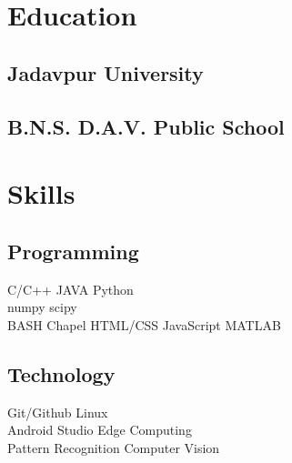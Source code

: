 \documentclass[]{myCV}
\begin{document}
\hfill
\begin{minipage}[t]{0.33\textwidth}


\section{Education}

\subsection{Jadavpur University}
\sectionsep

\subsection{B.N.S. D.A.V. Public School}
\sectionsep

\sectionsep

\section{Skills}
\subsection{Programming}
C/C++ \textbullet{} JAVA \textbullet{} Python \\
numpy \textbullet{} scipy \\
BASH \textbullet{} Chapel \textbullet{} HTML/CSS \textbullet{} JavaScript \textbullet{} MATLAB
\sectionsep

\subsection{Technology}
Git/Github \textbullet{} Linux \\
Android Studio \textbullet{} Edge Computing \\
Pattern Recognition \textbullet{} Computer Vision \\
\sectionsep


\end{minipage}
\end{document}
